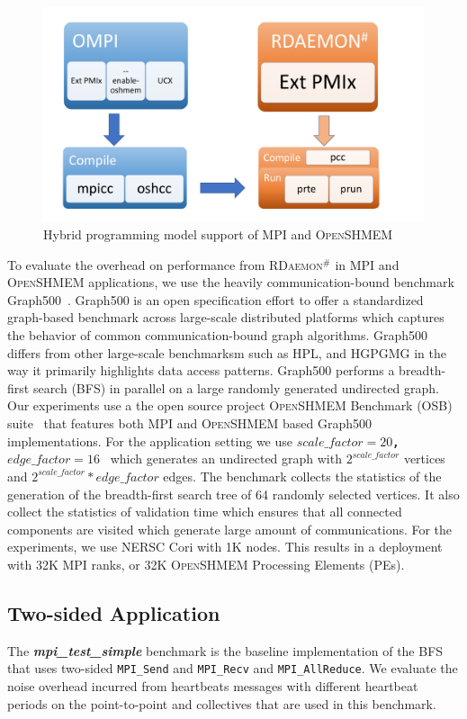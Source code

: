 \documentclass[5p,times,twocolumn]{elsarticle}
\newcommand{\mpifunc}[1]{\lstinline"MPI_#1"\xspace}
\newcommand{\mpi}[0]{\textsc{MPI}\xspace}
\newcommand{\oshmem}[0]{\textsc{OpenSHMEM}\xspace}
\newcommand{\ourwork}[0]{\textsc{RDaemon}\ensuremath{^\#}\xspace}
\begin{document}
\begin{figure}[h]
  \centering
  \includegraphics[width=\linewidth]{prrte_with_oshmem.pdf}\vspace{-1em}
  \caption{Hybrid programming model support of MPI and \oshmem}
  \label{fig:prrte.with.oshmem}
\end{figure}

To evaluate the overhead on performance from \ourwork
in \mpi and \oshmem applications, we use the heavily communication-bound benchmark Graph500~\cite{graph500}.
Graph500 is an open specification effort to offer a standardized graph-based
benchmark across large-scale distributed
platforms which captures the behavior of common communication-bound graph algorithms.
Graph500 differs from other large-scale
benchmarksm such as HPL, and HGPGMG in the way it primarily highlights data access patterns.
Graph500 performs a breadth-first search (BFS) in
parallel on a large randomly generated undirected graph. Our experiments use a
the open source project \oshmem Benchmark (OSB) suite~\cite{g500shmem} that features both \mpi and \oshmem based 
Graph500 implementations. For the application setting we use \texttt{\bf $scale\_factor = 20$, $edge\_factor = 16$ }
which generates an undirected graph with \texttt{\bf $2^{scale\_factor}$} vertices and
\texttt{\bf $2^{scale\_factor}*edge\_factor$} edges. The benchmark collects the statistics
of the generation of the breadth-first search tree of 64 randomly selected vertices. It also
collect the statistics of validation time which ensures that all connected components are visited
which generate large amount of communications. For the experiments, we use NERSC Cori with 1K nodes. This results in a deployment with 32K \mpi  ranks, or 32K \oshmem Processing Elements (PEs). 

\subsection{Two-sided Application}
The \textbf{\emph{mpi\_test\_simple}} benchmark  is the baseline implementation of the BFS that
uses two-sided \mpifunc{Send} and \mpifunc{Recv} and \mpifunc{AllReduce}.
We evaluate the noise overhead incurred from heartbeats messages with different heartbeat
periods on the point-to-point and collectives that are used in this benchmark.
\end{document}
